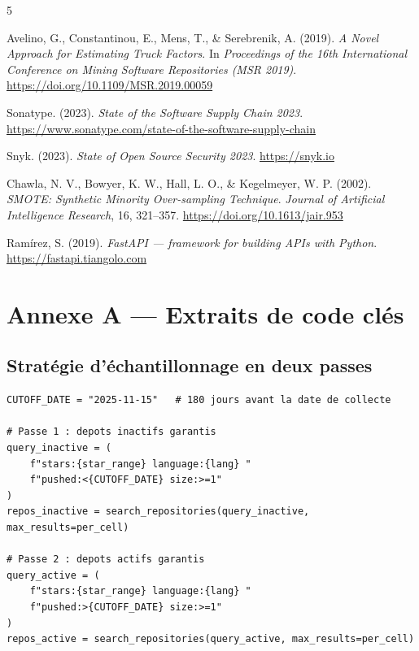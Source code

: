 \documentclass[12pt,a4paper]{article}
\begin{document}
\newpage

\begin{thebibliography}{5}

Avelino, G., Constantinou, E., Mens, T., \& Serebrenik, A. (2019).
\textit{A Novel Approach for Estimating Truck Factors}.
In \textit{Proceedings of the 16th International Conference on Mining Software
Repositories (MSR 2019)}.
\url{https://doi.org/10.1109/MSR.2019.00059}

Sonatype. (2023).
\textit{State of the Software Supply Chain 2023}.
\url{https://www.sonatype.com/state-of-the-software-supply-chain}

Snyk. (2023).
\textit{State of Open Source Security 2023}.
\url{https://snyk.io}

Chawla, N. V., Bowyer, K. W., Hall, L. O., \& Kegelmeyer, W. P. (2002).
\textit{SMOTE: Synthetic Minority Over-sampling Technique}.
\textit{Journal of Artificial Intelligence Research}, 16, 321--357.
\url{https://doi.org/10.1613/jair.953}

Ramírez, S. (2019).
\textit{FastAPI --- framework for building APIs with Python}.
\url{https://fastapi.tiangolo.com}

\end{thebibliography}

\newpage
\appendix
\section{Annexe A --- Extraits de code clés}

\subsection{Stratégie d'échantillonnage en deux passes}

\begin{lstlisting}[style=python, caption={Stratégie de collecte en deux passes (extrait de src/data\_collection.py)}, label=lst:collection]
CUTOFF_DATE = "2025-11-15"   # 180 jours avant la date de collecte

# Passe 1 : depots inactifs garantis
query_inactive = (
    f"stars:{star_range} language:{lang} "
    f"pushed:<{CUTOFF_DATE} size:>=1"
)
repos_inactive = search_repositories(query_inactive, max_results=per_cell)

# Passe 2 : depots actifs garantis
query_active = (
    f"stars:{star_range} language:{lang} "
    f"pushed:>{CUTOFF_DATE} size:>=1"
)
repos_active = search_repositories(query_active, max_results=per_cell)
\end{lstlisting}
\end{document}
